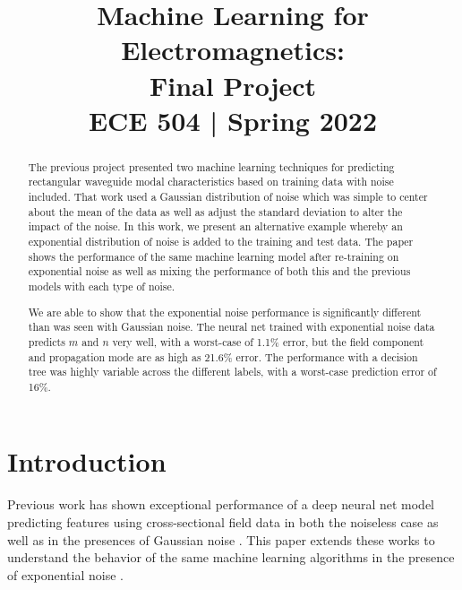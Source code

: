 \documentclass[conference]{IEEEtran}
\begin{document}
\title{Machine Learning for Electromagnetics: \\ Final Project \\ {\large ECE 504 | Spring 2022}}

\author{
}
\maketitle

\begin{abstract}
	The previous project presented two machine learning techniques for predicting rectangular waveguide modal characteristics based on training data with noise included. That work used a Gaussian distribution of noise which was simple to center about the mean of the data as well as adjust the standard deviation to alter the impact of the noise. In this work, we present an alternative example whereby an exponential distribution of noise is added to the training and test data. The paper shows the performance of the same machine learning model after re-training on exponential noise as well as mixing the performance of both this and the previous models with each type of noise. 
	
	We are able to show that the exponential noise performance is significantly different than was seen with Gaussian noise. The neural net trained with exponential noise data predicts $m$ and $n$ very well, with a worst-case of 1.1\% error, but the field component and propagation mode are as high as 21.6\% error. The performance with a decision tree was highly variable across the different labels, with a worst-case prediction error of 16\%.
	
\end{abstract}

\section{Introduction}\label{intro}
Previous work has shown exceptional performance of a deep neural net model predicting features using cross-sectional field data in both the noiseless case \cite{newberry_machine_2022} as well as in the presences of Gaussian noise \cite{newberry_machine_2022-1}.
This paper extends these works to understand the behavior of the same machine learning algorithms in the presence of exponential noise \cite{noauthor_exponential_2022}.
\end{document}
